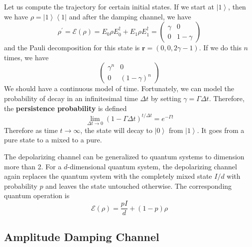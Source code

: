 \documentclass{article}
\newcommand{\ket}[1]{\ensuremath{\left|#1\right\rangle}}
\newcommand{\bra}[1]{\ensuremath{\left\langle#1\right|}}
\begin{document}
    \begin{example}
      Let us compute the trajectory for certain initial states. If we start at $\ket{1}$, then we have $\rho = \ket{1} \bra{1}$ and after the damping channel, we have 
      \begin{equation}
        \rho^\prime = \mathcal{E}(\rho) = E_0 \rho E_0^\dagger + E_1 \rho E_1^\dagger = \begin{pmatrix} \gamma & 0 \\ 0 & 1 - \gamma \end{pmatrix}
      \end{equation}
      and the Pauli decomposition for this state is $\mathbf{r} = (0, 0, 2 \gamma - 1)$. If we do this $n$ times, we have 
      \begin{equation}
        \begin{pmatrix} \gamma^n & 0 \\ 0 & (1 - \gamma)^n \end{pmatrix}
      \end{equation}
      We should have a continuous model of time. Fortunately, we can model the probability of decay in an infinitesimal time $\Delta t$ by setting $\gamma = \Gamma \Delta t$. Therefore, the \textbf{persistence probability} is defined 
      \begin{equation}
        \lim_{\Delta t \rightarrow 0} (1 - \Gamma \Delta t)^{t / \Delta t} = e^{-\Gamma t}
      \end{equation}
      Therefore as time $t \rightarrow \infty$, the state will decay to $\ket{0}$ from $\ket{1}$. It goes from a pure state to a mixed to a pure. 
    \end{example}

    The depolarizing channel can be generalized to quantum systems to dimension more than 2. For a $d$-dimensional quantum system, the depolarizing channel again replaces the quantum system with the completely mixed state $I/d$ with probability $p$ and leaves the state untouched otherwise. The corresponding quantum operation is 
    \begin{equation}
      \mathcal{E}(\rho) = \frac{p I}{d} + (1 - p) \rho 
    \end{equation}

  \subsection{Amplitude Damping Channel}
\end{document}
